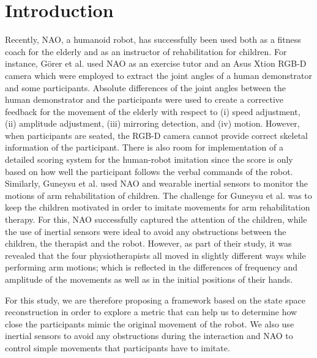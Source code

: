 \documentclass{sig-alternate-05-2015}
\begin{document}



\printccsdesc


\section{Introduction}
Recently, NAO, a humanoid robot, has successfully been used both as a fitness coach for the elderly 
and as an instructor of rehabilitation for children.
For instance, G{\"{o}}rer et al. \cite{Gorer2016} used NAO as an exercise tutor and an Asus Xtion RGB-D camera 
which were employed to extract the joint angles of a human demonstrator and some participants. 
Absolute differences of the joint angles between the human demonstrator and the participants
were used to create a corrective feedback for the movement of the elderly 
with respect to (i) speed adjustment, (ii) amplitude adjustment, (iii) mirroring detection, and (iv) motion.
However, when participants are seated, the RGB-D camera cannot provide 
correct skeletal information of the participant.
There is also room for implementation of a detailed scoring system for the human-robot imitation
since the score is only based on how well the participant follows the verbal commands of the robot.
Similarly, Guneysu et al. \cite{Guneysu2015} used NAO and wearable inertial sensors
to monitor the motions of arm rehabilitation of children.
The challenge for Guneysu et al. was to keep the children motivated in order to imitate 
movements for arm rehabilitation therapy. 
For this, NAO successfully captured the attention of the children,
while the use of inertial sensors were ideal to avoid any  
obstructions between the children, the therapist and the robot.
However, as part of their study, 
it was revealed that the four physiotherapists all moved in slightly different ways
while performing arm motions; 
which is reflected in the differences of frequency and amplitude of the movements
as well as in the initial positions of their hands.

For this study, we are therefore proposing a framework based on the state space reconstruction 
in order to explore a metric that can help us to determine 
how close the participants mimic the original movement of the robot.
We also use inertial sensors to avoid any obstructions during the interaction 
and NAO to control simple movements that participants have to imitate.
\end{document}
